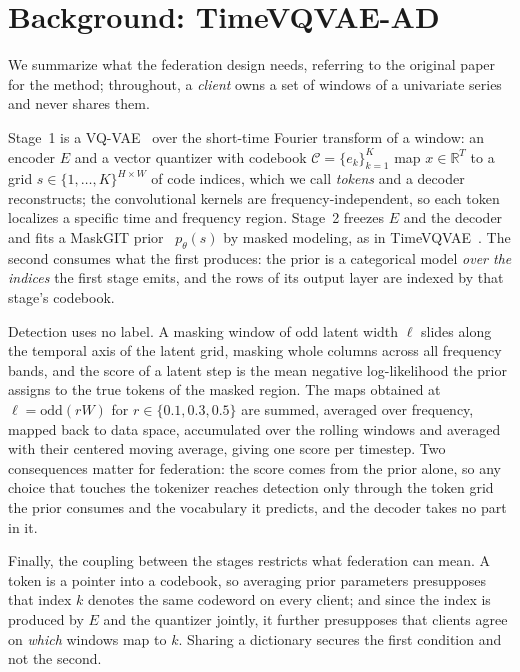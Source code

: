 \documentclass[conference]{IEEEtran}
\begin{document}
\section{Background: TimeVQVAE-AD}
\label{sec:background}

We summarize what the federation design needs, referring to the original
paper~\cite{lee2024timevqvaead} for the method; throughout, a \emph{client} owns a set of windows
of a univariate series and never shares them.

Stage~1 is a VQ-VAE~\cite{van2017neural} over the short-time Fourier transform of a window: an
encoder $E$ and a vector quantizer with codebook $\mathcal{C}=\{e_k\}_{k=1}^{K}$ map
$x\in\mathbb{R}^{T}$ to a grid $s\in\{1,\dots,K\}^{H\times W}$ of code indices, which we call
\emph{tokens} and a decoder reconstructs; the convolutional kernels are frequency-independent, so
each token localizes a specific time and frequency region. Stage~2 freezes $E$ and the decoder and
fits a MaskGIT prior~\cite{chang2022maskgit} $p_\theta(s)$ by masked modeling, as in
TimeVQVAE~\cite{lee2023timevqvae}. The second consumes what the first produces: the prior is a
categorical model \emph{over the indices} the first stage emits, and the rows of its output layer
are indexed by that stage's codebook.

Detection uses no label. A masking window of odd latent width $\ell$ slides along the temporal
axis of the latent grid, masking whole columns across all frequency bands, and the score of a
latent step is the mean negative log-likelihood the prior assigns to the true tokens of the masked
region. The maps obtained at $\ell=\mathrm{odd}(rW)$ for $r\in\{0.1,0.3,0.5\}$ are summed,
averaged over frequency, mapped back to data space, accumulated over the rolling windows and
averaged with their centered moving average, giving one score per timestep. Two consequences matter
for federation: the score comes from the prior alone, so any choice that touches the tokenizer
reaches detection only through the token grid the prior consumes and the vocabulary it predicts,
and the decoder takes no part in it.

Finally, the coupling between the stages restricts what federation can mean. A token is a pointer
into a codebook, so averaging prior parameters presupposes that index $k$ denotes the same codeword
on every client; and since the index is produced by $E$ and the quantizer jointly, it further
presupposes that clients agree on \emph{which} windows map to $k$. Sharing a dictionary secures the
first condition and not the second.
\end{document}
